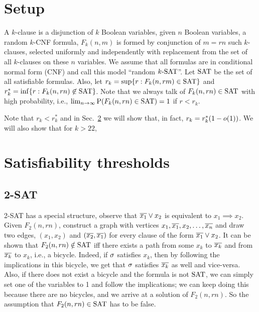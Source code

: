 \documentclass[letterpaper, 10pt, twocolumn, reqno]{amsart}
\begin{document}
\section{Setup}
\label{sec:setup}
A $k$-clause is a disjunction of $k$ Boolean variables, given $n$ Boolean
variables, a random $k$-CNF formula, $F_k(n, m)$ is formed by conjunction of $m = rn$ such $k$-clauses, selected uniformly and independently with
replacement from the set of all $k$-clauses on these $n$ variables. We assume that all formulas are in conditional normal form (CNF) and call this model ``random $k\textrm{-SAT}$''. Let $\textrm{SAT}$ be the set of all satisfiable formulas. Also,
let $r_k = \sup \{ r: F_k(n, rm) \in \textrm{SAT} \}$ and $r_k^* = \inf \{ r: F_k(n, rn) \not\in \textrm{SAT} \}$. Note that we always talk of $F_k(n,rn) \in \textrm{SAT}$ with high probability, i.e., $\lim_{n\to \infty} \textrm{P}(F_k(n,rn) \in \textrm{SAT}) = 1$ if $r < r_k$.

Note that $r_k < r_k^*$ and in Sec.~\ref{sec:sat_thresh}
we will show that, in fact, $r_k = r_k^*(1-o(1))$. We will also show that for $k > 22$,

\section{Satisfiability thresholds}
\label{sec:sat_thresh}


\subsection{2-SAT}
\label{ssec:2sat}
2-SAT has a special structure, observe that $\overline{x_1} \vee x_2$ is equivalent to $x_1 \implies x_2$. Given $F_2(n, rn)$, construct a graph with
vertices $x_1, \overline{x_1}, x_2, \ldots, \overline{x_n}$ and draw two edges, $(x_1, x_2)$ and $(\overline{x_2}, \overline{x_1})$ for every clause of the form $\overline{x_1} \vee x_2$. It can be shown that $F_2(n,rn) \notin \textrm{SAT}$ iff
there exists a path from some $x_k$ to $\overline{x_k}$ and from $\overline{x_k}$ to $x_k$, i.e., a bicycle. Indeed, if $\sigma$ satisfies $x_k$, then by following the implications in this bicycle,
we get that $\sigma$ satisfies $\overline{x_k}$ as well and vice-versa. Also, if there does not exist a bicycle and the formula is not $\textrm{SAT}$, we can simply set one of the
variables to 1 and follow the implications; we can keep doing this because there are no bicycles, and we arrive at a solution of $F_2(n, rn)$. So the
assumption that $F_2(n,rn) \in \textrm{SAT}$ has to be false.
\end{document}
